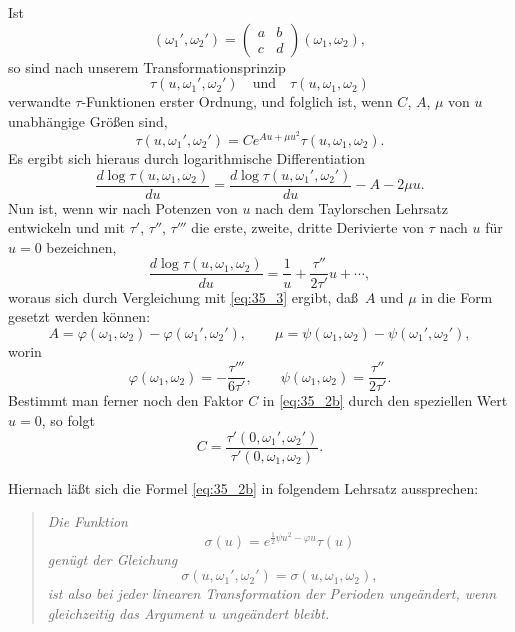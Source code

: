 \documentclass[12pt,a4paper]{article}
\begin{document}
Ist
\[
(\omega_1',\omega_2') = \begin{pmatrix} a & b \\ c & d \end{pmatrix}(\omega_1,\omega_2),
\]
so sind nach unserem Transformationsprinzip
\[
\tau(u,\omega_1',\omega_2')\quad\text{und}\quad \tau(u,\omega_1,\omega_2)
\]
verwandte $\tau$-Funktionen erster Ordnung, und folglich ist, wenn $C$, $A$, $\mu$ von $u$ unabh\"angige Gr\"o\ss en sind,
\begin{equation}\label{eq:35_2b}
\tau(u,\omega_1',\omega_2') = Ce^{Au+\mu u^2}\tau(u,\omega_1,\omega_2).
\end{equation}
Es ergibt sich hieraus durch logarithmische Differentiation
\begin{equation}\label{eq:35_3}
\frac{d\log\tau(u,\omega_1,\omega_2)}{du} = \frac{d\log\tau(u,\omega_1',\omega_2')}{du} - A - 2\mu u.
\end{equation}
Nun ist, wenn wir nach Potenzen von $u$ nach dem Taylorschen Lehrsatz entwickeln und mit $\tau'$, $\tau''$, $\tau'''$ die erste, zweite, dritte Derivierte von $\tau$ nach $u$ f\"ur $u=0$ bezeichnen,
\[
\frac{d\log\tau(u,\omega_1,\omega_2)}{du} = \frac{1}{u} + \frac{\tau''}{2\tau'}u + \cdots,
\]
woraus sich durch Vergleichung mit \eqref{eq:35_3} ergibt, da\ss\ $A$ und $\mu$ in die Form gesetzt werden k\"onnen:
\[
A = \varphi(\omega_1,\omega_2) - \varphi(\omega_1',\omega_2'),\qquad
\mu = \psi(\omega_1,\omega_2) - \psi(\omega_1',\omega_2'),
\]
worin
\begin{equation}\label{eq:35_4}
\varphi(\omega_1,\omega_2) = -\frac{\tau'''}{6\tau'},\qquad
\psi(\omega_1,\omega_2) = \frac{\tau''}{2\tau'}.
\end{equation}
Bestimmt man ferner noch den Faktor $C$ in \eqref{eq:35_2b} durch den speziellen Wert $u=0$, so folgt
\begin{equation}\label{eq:35_5}
C = \frac{\tau'(0,\omega_1',\omega_2')}{\tau'(0,\omega_1,\omega_2)}.
\end{equation}

\newpage
\noindent
Hiernach l\"a\ss t sich die Formel \eqref{eq:35_2b} in folgendem Lehrsatz aussprechen:

\begin{quote}
\textit{Die Funktion}
\begin{equation}\label{eq:35_6}
\sigma(u) = e^{\frac{1}{2}\psi u^2 - \varphi u}\tau(u)
\end{equation}
\textit{gen\"ugt der Gleichung}
\begin{equation}\label{eq:35_7}
\sigma(u,\omega_1',\omega_2') = \sigma(u,\omega_1,\omega_2),
\end{equation}
\textit{ist also bei jeder linearen Transformation der Perioden unge\"andert, wenn gleichzeitig das Argument $u$ unge\"andert bleibt.}
\end{quote}
\end{document}
